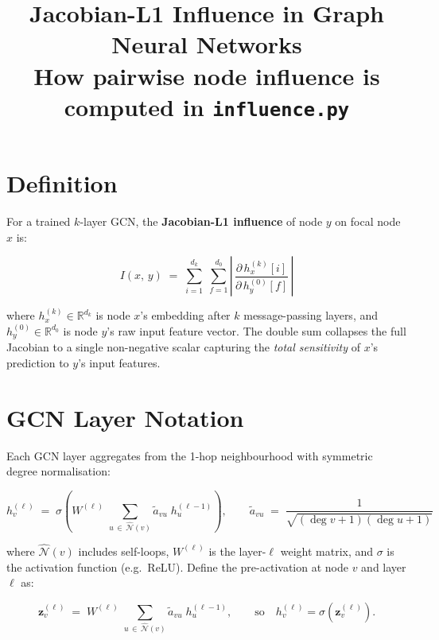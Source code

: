 \documentclass[11pt]{article}
\title{\textbf{Jacobian-L1 Influence in Graph Neural Networks}\\[0.4em]
       \large How pairwise node influence is computed in \texttt{influence.py}}
\author{}
\date{}
\begin{document}
\maketitle

\section{Definition}

For a trained $k$-layer GCN, the \textbf{Jacobian-L1 influence} of node $y$ on
focal node $x$ is:

\begin{equation}
  I(x,\, y)
  \;=\;
  \sum_{i=1}^{d_k}\;\sum_{f=1}^{d_0}
  \left|\,
    \frac{\partial\, h_x^{(k)}[i]}{\partial\, h_y^{(0)}[f]}
  \,\right|
  \label{eq:def}
\end{equation}

where $h_x^{(k)} \in \mathbb{R}^{d_k}$ is node $x$'s embedding after $k$
message-passing layers, and $h_y^{(0)} \in \mathbb{R}^{d_0}$ is node $y$'s
raw input feature vector. The double sum collapses the full Jacobian to a
single non-negative scalar capturing the \emph{total sensitivity} of $x$'s
prediction to $y$'s input features.

\section{GCN Layer Notation}

Each GCN layer aggregates from the 1-hop neighbourhood with symmetric
degree normalisation:

\begin{equation}
  h_v^{(\ell)}
  \;=\;
  \sigma\!\left(
    W^{(\ell)}\;
    \sum_{u \,\in\, \hat{\mathcal{N}}(v)}
    \tilde{a}_{vu}\; h_u^{(\ell-1)}
  \right),
  \qquad
  \tilde{a}_{vu}
  \;=\;
  \frac{1}{\sqrt{(\deg v + 1)(\deg u + 1)}}
  \label{eq:gcn}
\end{equation}

where $\hat{\mathcal{N}}(v)$ includes self-loops, $W^{(\ell)}$ is the
layer-$\ell$ weight matrix, and $\sigma$ is the activation function (e.g.\
ReLU). Define the pre-activation at node $v$ and layer $\ell$ as:

\begin{equation}
  \mathbf{z}_v^{(\ell)}
  \;=\;
  W^{(\ell)}\;
  \sum_{u \,\in\, \hat{\mathcal{N}}(v)}
  \tilde{a}_{vu}\; h_u^{(\ell-1)},
  \qquad\text{so}\quad
  h_v^{(\ell)} = \sigma\!\left(\mathbf{z}_v^{(\ell)}\right).
\end{equation}
\end{document}
